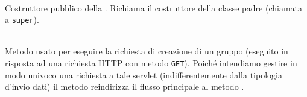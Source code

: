 \begin{description}
	\item{}\\
	Costruttore pubblico della . Richiama il costruttore della classe padre (chiamata a \texttt{super}).
	
	\item{}\\
	Metodo usato per eseguire la richiesta di creazione di un gruppo (eseguito in risposta ad una richiesta HTTP con metodo \texttt{GET}). Poiché intendiamo gestire in modo univoco una richiesta a tale servlet (indifferentemente dalla tipologia d'invio dati) il metodo reindirizza il flusso principale al metodo .
	

\end{description}
